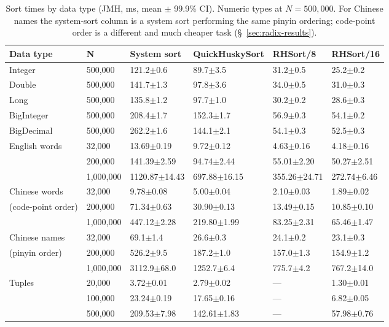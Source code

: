 \documentclass[twoside,leqno,twocolumn]{article}
\begin{document}
\begin{table}
  \caption{Sort times by data type (JMH, ms, mean $\pm$ 99.9\% CI). Numeric types at $N=500{,}000$.
    For Chinese names the system-sort column is a system sort performing the same pinyin ordering;
    code-point order is a different and much cheaper task (\S~\ref{sec:radix-results}).}
  \label{tab:HS_BM}
  \begin{tabular}{llllll}
    \toprule
    Data type & N & System sort & QuickHuskySort & RHSort/8 & RHSort/16 \\
    \midrule
    Integer & 500,000 & 121.2$\pm$0.6 & 89.7$\pm$3.5 & 31.2$\pm$0.5 & 25.2$\pm$0.2 \\
    Double & 500,000 & 141.7$\pm$1.3 & 97.8$\pm$3.6 & 34.0$\pm$0.5 & 31.0$\pm$0.3 \\
    Long & 500,000 & 135.8$\pm$1.2 & 97.7$\pm$1.0 & 30.2$\pm$0.2 & 28.6$\pm$0.3 \\
    BigInteger & 500,000 & 208.4$\pm$1.7 & 152.3$\pm$1.7 & 56.9$\pm$0.3 & 54.1$\pm$0.2 \\
    BigDecimal & 500,000 & 262.2$\pm$1.6 & 144.1$\pm$2.1 & 54.1$\pm$0.3 & 52.5$\pm$0.3 \\
    English words & 32,000 & 13.69$\pm$0.19 & 9.72$\pm$0.12 & 4.63$\pm$0.16 & 4.18$\pm$0.16 \\
    & 200,000 & 141.39$\pm$2.59 & 94.74$\pm$2.44 & 55.01$\pm$2.20 & 50.27$\pm$2.51 \\
    & 1,000,000 & 1120.87$\pm$14.43 & 697.88$\pm$16.15 & 355.26$\pm$24.71 & 272.74$\pm$6.46 \\
    Chinese words & 32,000 & 9.78$\pm$0.08 & 5.00$\pm$0.04 & 2.10$\pm$0.03 & 1.89$\pm$0.02 \\
    (code-point order) & 200,000 & 71.34$\pm$0.63 & 30.90$\pm$0.13 & 13.49$\pm$0.15 & 10.85$\pm$0.10 \\
    & 1,000,000 & 447.12$\pm$2.28 & 219.80$\pm$1.99 & 83.25$\pm$2.31 & 65.46$\pm$1.47 \\
    Chinese names & 32,000 & 69.1$\pm$1.4 & 26.6$\pm$0.3 & 24.1$\pm$0.2 & 23.1$\pm$0.3 \\
    (pinyin order) & 200,000 & 526.2$\pm$9.5 & 187.2$\pm$1.0 & 157.0$\pm$1.3 & 154.9$\pm$1.2 \\
    & 1,000,000 & 3112.9$\pm$68.0 & 1252.7$\pm$6.4 & 775.7$\pm$4.2 & 767.2$\pm$14.0 \\
    Tuples & 20,000 & 3.72$\pm$0.01 & 2.79$\pm$0.02 & --- & 1.30$\pm$0.01 \\
    & 100,000 & 23.24$\pm$0.19 & 17.65$\pm$0.16 & --- & 6.82$\pm$0.05 \\
    & 500,000 & 209.53$\pm$7.98 & 142.61$\pm$1.83 & --- & 57.98$\pm$0.76 \\
    \bottomrule
  \end{tabular}
\end{table}
\end{document}
